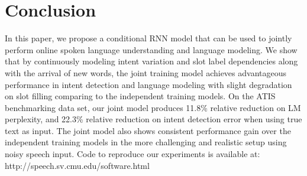 \documentclass[11pt]{article}
\begin{document}
\section{Conclusion}
    In this paper, we propose a conditional RNN model that can be used to jointly perform online spoken language understanding and language modeling. We show that by continuously modeling intent variation and slot label dependencies along with the arrival of new words, the joint training model achieves advantageous performance in intent detection and language modeling with slight degradation on slot filling comparing to the independent training models. On the ATIS benchmarking data set, our joint model produces 11.8\% relative reduction on LM perplexity, and 22.3\% relative reduction on intent detection error when using true text as input. The joint model also shows consistent performance gain over the independent training models in the more challenging and realistic setup using noisy speech input. Code to reproduce our experiments is available at: http://speech.sv.cmu.edu/software.html
  


\end{document}
